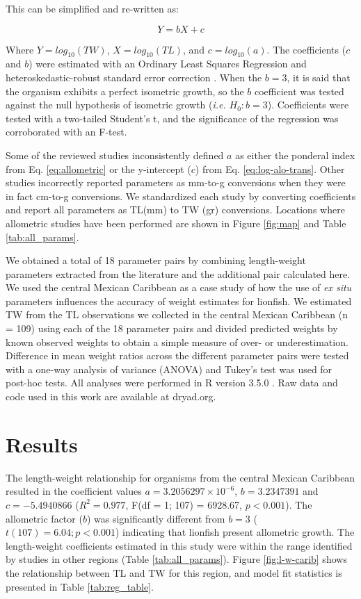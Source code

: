 \documentclass[]{article}
\theoremstyle{definition}
\theoremstyle{definition}
\theoremstyle{definition}
\theoremstyle{remark}
\begin{document}
This can be simplified and re-written as:

\begin{equation}
\label{eq:log-alo-trans}
Y = bX + c
\end{equation}

Where \(Y = log_{10}(TW)\), \(X = log_{10}(TL)\), and
\(c = log_{10}(a)\). The coefficients (\(c\) and \(b\)) were estimated
with an Ordinary Least Squares Regression and heteroskedastic-robust
standard error correction \citep{zeileis_2004}. When the \(b = 3\), it
is said that the organism exhibits a perfect isometric growth, so the
\(b\) coefficient was tested against the null hypothesis of isometric
growth (\emph{i.e.} \(H_0: b = 3\)). Coefficients were tested with a
two-tailed Student's t, and the significance of the regression was
corroborated with an F-test.

Some of the reviewed studies inconsistently defined \(a\) as either the
ponderal index from Eq. \ref{eq:allometric} or the y-intercept (\(c\))
from Eq. \ref{eq:log-alo-trans}. Other studies incorrectly reported
parameters as mm-to-g conversions when they were in fact cm-to-g
conversions. We standardized each study by converting coefficients and
report all parameters as TL(mm) to TW (gr) conversions. Locations where
allometric studies have been performed are shown in Figure \ref{fig:map}
and Table \ref{tab:all_params}.

We obtained a total of 18 parameter pairs by combining length-weight
parameters extracted from the literature and the additional pair
calculated here. We used the central Mexican Caribbean as a case study
of how the use of \emph{ex situ} parameters influences the accuracy of
weight estimates for lionfish. We estimated TW from the TL observations
we collected in the central Mexican Caribbean (n = 109) using each of
the 18 parameter pairs and divided predicted weights by known observed
weights to obtain a simple measure of over- or underestimation.
Difference in mean weight ratios across the different parameter pairs
were tested with a one-way analysis of variance (ANOVA) and Tukey's test
was used for post-hoc tests. All analyses were performed in R version
3.5.0 \citep{rcore_2018}. Raw data and code used in this work are
available at dryad.org.

\section{Results}\label{results}

The length-weight relationship for organisms from the central Mexican
Caribbean resulted in the coefficient values
\(a = 3.2056297\times 10^{-6}\), \(b = 3.2347391\) and
\(c = -5.4940866\) (\(R^2 = 0.977\), F(df = 1; 107) = 6928.67,
\(p < 0.001\)). The allometric factor (\(b\)) was significantly
different from \(b = 3\) (\(t(107) = 6.04; p<0.001\)) indicating that
lionfish present allometric growth. The length-weight coefficients
estimated in this study were within the range identified by studies in
other regions (Table \ref{tab:all_params}). Figure \ref{fig:l-w-carib}
shows the relationship between TL and TW for this region, and model fit
statistics is presented in Table \ref{tab:reg_table}.
\end{document}
